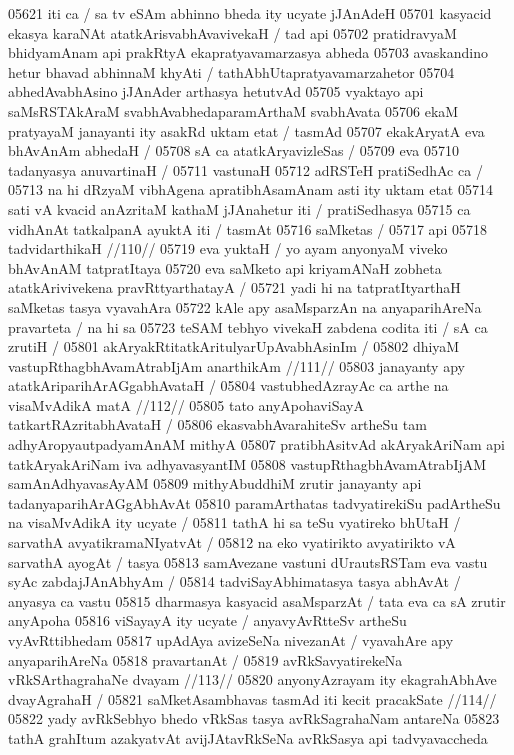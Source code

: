 05621 iti ca / sa tv eSAm abhinno bheda ity ucyate jJAnAdeH 
05701 kasyacid ekasya karaNAt atatkArisvabhAvavivekaH / tad api  
05702 pratidravyaM bhidyamAnam api prakRtyA ekapratyavamarzasya abheda
05703 avaskandino hetur bhavad abhinnaM khyAti / tathAbhUtapratyavamarzahetor
05704 abhedAvabhAsino jJAnAder arthasya hetutvAd
05705 vyaktayo api saMsRSTAkAraM svabhAvabhedaparamArthaM svabhAvata
05706 ekaM pratyayaM janayanti ity asakRd uktam etat / tasmAd
05707 ekakAryatA eva bhAvAnAm abhedaH /  
05708 	sA ca atatkAryavizleSas /
05709 eva  
05710 	tadanyasya anuvartinaH /  
05711 vastunaH
05712 	adRSTeH pratiSedhAc ca / 
05713 na hi dRzyaM vibhAgena apratibhAsamAnam asti ity uktam etat
05714 sati vA kvacid anAzritaM kathaM jJAnahetur iti / pratiSedhasya  
05715 ca vidhAnAt tatkalpanA ayuktA iti / tasmAt  
05716 	saMketas / 
05717 api  
05718 	tadvidarthikaH //110//
05719 eva yuktaH / yo ayam anyonyaM viveko bhAvAnAM tatpratItaya  
05720 eva saMketo api kriyamANaH zobheta atatkArivivekena pravRttyarthatayA /
05721 yadi hi na tatpratItyarthaH saMketas tasya vyavahAra  
05722 kAle apy asaMsparzAn na anyaparihAreNa pravarteta / na hi sa 
05723 teSAM tebhyo vivekaH zabdena codita iti / sA ca zrutiH / 
05801 	akAryakRtitatkAritulyarUpAvabhAsinIm / 
05802 	dhiyaM vastupRthagbhAvamAtrabIjAm anarthikAm //111//
05803 	janayanty apy atatkAriparihArAGgabhAvataH /
05804 	vastubhedAzrayAc ca arthe na visaMvAdikA matA //112//  
05805 	tato anyApohaviSayA tatkartRAzritabhAvataH /  
05806 ekasvabhAvarahiteSv artheSu tam adhyAropyautpadyamAnAM mithyA 
05807 pratibhAsitvAd akAryakAriNam api tatkAryakAriNam iva adhyavasyantIM
05808 vastupRthagbhAvamAtrabIjAM samAnAdhyavasAyAM
05809 mithyAbuddhiM zrutir janayanty api tadanyaparihArAGgAbhAvAt 
05810 paramArthatas tadvyatirekiSu padArtheSu na visaMvAdikA ity ucyate /  
05811 tathA hi sa teSu vyatireko bhUtaH / sarvathA avyatikramaNIyatvAt /
05812 na eko vyatirikto avyatirikto vA sarvathA ayogAt / tasya
05813 samAvezane vastuni dUrautsRSTam eva vastu syAc zabdajJAnAbhyAm /  
05814 tadviSayAbhimatasya tasya abhAvAt / anyasya ca vastu 
05815 dharmasya kasyacid asaMsparzAt / tata eva ca sA zrutir anyApoha 
05816 viSayayA ity ucyate / anyavyAvRtteSv artheSu vyAvRttibhedam  
05817 upAdAya avizeSeNa nivezanAt / vyavahAre apy anyaparihAreNa 
05818 pravartanAt /
05819 	avRkSavyatirekeNa vRkSArthagrahaNe dvayam //113// 
05820 	anyonyAzrayam ity ekagrahAbhAve dvayAgrahaH /
05821 	saMketAsambhavas tasmAd iti kecit pracakSate //114//  
05822 yady avRkSebhyo bhedo vRkSas tasya avRkSagrahaNam antareNa
05823 tathA grahItum azakyatvAt avijJAtavRkSeNa avRkSasya api tadvyavaccheda
